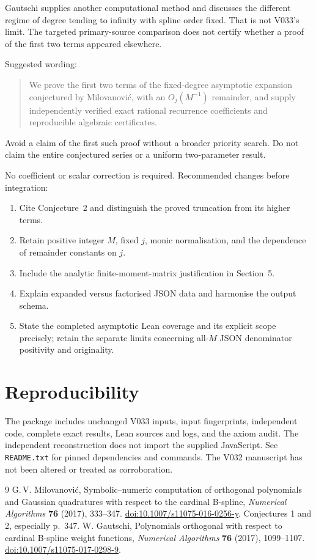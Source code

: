 \documentclass[11pt,a4paper]{article}
\begin{document}
Gautschi \cite{gautschi} supplies another computational method and discusses the different regime of degree tending to infinity with spline order fixed. That is not V033's limit. The targeted primary-source comparison does not certify whether a proof of the first two terms appeared elsewhere.

Suggested wording:
\begin{quote}
We prove the first two terms of the fixed-degree asymptotic expansion conjectured by Milovanovi\'c, with an $O_j(M^{-1})$ remainder, and supply independently verified exact rational recurrence coefficients and reproducible algebraic certificates.
\end{quote}
Avoid a claim of the first such proof without a broader priority search. Do not claim the entire conjectured series or a uniform two-parameter result.

No coefficient or scalar correction is required. Recommended changes before integration:
\begin{enumerate}
\item Cite Conjecture~2 and distinguish the proved truncation from its higher terms.
\item Retain positive integer $M$, fixed $j$, monic normalisation, and the dependence of remainder constants on $j$.
\item Include the analytic finite-moment-matrix justification in Section~5.
\item Explain expanded versus factorised JSON data and harmonise the output schema.
\item State the completed asymptotic Lean coverage and its explicit scope precisely; retain the separate limits concerning all-$M$ JSON denominator positivity and originality.
\end{enumerate}

\section{Reproducibility}
The package includes unchanged V033 inputs, input fingerprints, independent code, complete exact results, Lean sources and logs, and the axiom audit. The independent reconstruction does not import the supplied JavaScript. See \texttt{README.txt} for pinned dependencies and commands. The V032 manuscript has not been altered or treated as corroboration.

\begin{thebibliography}{9}
G.\,V. Milovanovi\'c,
Symbolic--numeric computation of orthogonal polynomials and Gaussian quadratures with respect to the cardinal B-spline,
\emph{Numerical Algorithms} \textbf{76} (2017), 333--347.
\href{https://doi.org/10.1007/s11075-016-0256-y}{doi:10.1007/s11075-016-0256-y}.
Conjectures 1 and 2, especially p.~347.
W. Gautschi,
Polynomials orthogonal with respect to cardinal B-spline weight functions,
\emph{Numerical Algorithms} \textbf{76} (2017), 1099--1107.
\href{https://doi.org/10.1007/s11075-017-0298-9}{doi:10.1007/s11075-017-0298-9}.
\end{thebibliography}
\end{document}
